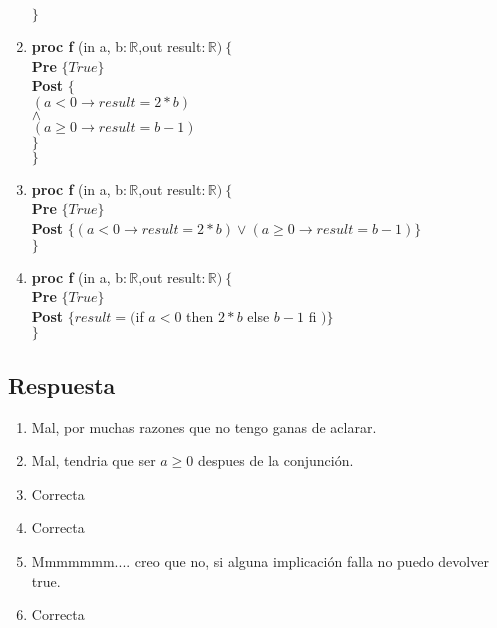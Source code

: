 \documentclass[a4paper]{article}
\begin{document}
\begin{enumerate}[label=\alph*)]
			$\}$
		\item
			\textbf{proc f }(in a, b$: \mathbb{R}$,out result$:\mathbb{R})\ \{$\smallskip \\
			\hspace*{6mm} \textbf{Pre }$\{ True\}$\smallskip \\
			\hspace*{6mm} \textbf{Post }$\{$\\
			\hspace*{6mm} $(a < 0 \rightarrow result=2*b)$\\
			\hspace*{6mm} $\wedge$\\
			\hspace*{6mm} $(a \geq 0 \rightarrow result=b-1)$\\			
			\hspace*{6mm}$\}$\\
			$\}$
		\item
			\textbf{proc f }(in a, b$: \mathbb{R}$,out result$:\mathbb{R})\ \{$\smallskip \\
			\hspace*{6mm} \textbf{Pre }$\{ True\}$\smallskip \\
			\hspace*{6mm} \textbf{Post }$\{(a<0\rightarrow result=2*b)\vee (
				a\geq 0 \rightarrow result = b-1)\}$\\
			$\}$
		\item
			\textbf{proc f }(in a, b$: \mathbb{R}$,out result$:\mathbb{R})\ \{$\smallskip \\
			\hspace*{6mm} \textbf{Pre }$\{ True\}$\smallskip \\
			\hspace*{6mm} \textbf{Post }$\{result=($if $ a<0$ then $2*b$ else $b-1$ fi $)\}$\\
			$\}$
	\end{enumerate}
\subsection*{Respuesta}
	\begin{enumerate}[label=\alph*)]
		\item Mal, por muchas razones que no tengo ganas de aclarar.
		\item Mal, tendria que ser $a\geq 0$ despues de la conjunción.
		\item Correcta
		\item Correcta
		\item Mmmmmmm.... creo que no, si alguna implicación falla no puedo devolver true.
		\item Correcta
	\end{enumerate}
\end{document}
